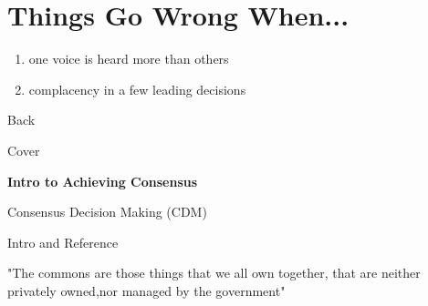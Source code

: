 \documentclass{article}
\begin{document}
		\section{Things Go Wrong When...}
	\begin{enumerate}
	\item one voice is heard more than others
	\item complacency in a few leading decisions
	\end{enumerate}
	\newpage
	
	Back\par Cover 
	\thispagestyle{empty} 
	
	\newpage
	{\centering \huge \textbf{Intro to Achieving       Consensus}\par}
	
	
	Consensus Decision Making (CDM) 
	
	Intro and Reference
	
	"The commons are those things     that we all own together, that are neither privately owned,nor managed by the government"
	
	 \thispagestyle{empty} 
	 
\end{document}
